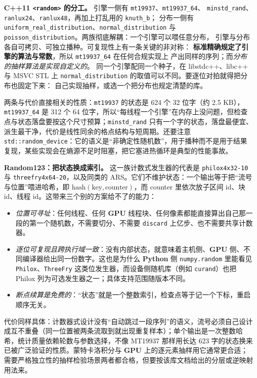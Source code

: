 \documentclass[12pt,a4paper,fontset=fandol]{ctexbook}
\newcommand{\Tp}[1]{\texttt{#1}}
\newcommand{\Bk}{\allowbreak}
\newcommand{\Lib}[1]{\textbf{#1}}
\newcommand{\Lang}[1]{\textsf{\bfseries #1}}
\newcommand{\CPP}{\Lang{C++}}
\newcommand{\PY}{\Lang{Python}}
\begin{document}
\textbf{\CPP{}11 \Tp{<random>} 的分工。} 引擎一侧有 \Tp{mt19937}、\Tp{mt19937\_64}、
\Tp{minstd\_{\Bk}rand}、\Tp{ranlux24}、\Tp{ranlux48}，再加上打乱用的 \Tp{knuth\_b}；
分布一侧有 \Tp{uniform\_{\Bk}real\_{\Bk}distribution}、\Tp{normal\_{\Bk}distribution} 与
\Tp{poisson\_{\Bk}distribution}。两族彻底解耦：一个引擎可以喂任意分布，
引擎与分布各自可拷贝、可独立播种。可复现性上有一条关键的非对称：
\textbf{标准精确规定了引擎的算法与常数}，所以 \Tp{mt19937\_64} 在任何合规实现上
产出同样的序列；而\emph{分布的抽样算法是实现自定义的}。
同一个引擎配同一个种子，在 libstdc++、libc++ 与 MSVC STL 上
\Tp{normal\_{\Bk}distribution} 的取值可以不同。要逐位对拍就得把分布也固定下来：
自己实现抽样，或选一个把分布也规定清楚的库。

两条与代价直接相关的性质：\Tp{mt19937} 的状态是 624 个 32 位字（约 2.5 KB），\Tp{mt19937\_64} 是 312 个 64 位字，所以``每线程一个引擎''在内存上没问题，但检查点与状态落盘要按这个尺寸预算；\Tp{minstd\_rand} 只有一个字的状态，落盘最便宜、派生最干净，代价是线性同余的格点结构与短周期。还要注意 \Tp{std::random\_device}：它的语义是``非确定性随机数''，用于播种而不是用于结果复现，某些实现会在熵源不足时阻塞，把它塞进热循环是典型的性能事故。

\textbf{\Lib{Random123}：把状态换成索引。} 这一族计数式发生器的代表是 \Tp{philox4x32-10} 与 \Tp{threefry4x64-20}，以及同类的 ARS。它们不维护状态：一个输出等于把``流号与位置''喂进哈希，即 $\mathrm{hash}(\text{key},\text{counter})$，而 counter 里依次放子区间 id、块 id、线程 id。这带来三个别的方案给不了的能力：
\begin{itemize}
\item \emph{位置可寻址}：任何线程、任何 \Lang{GPU} 线程块、任何像素都能直接算出自己那一段的第一个随机数，不需要切分、不需要 \Tp{discard} 上亿步、也不需要共享计数器。
\item \emph{逐位可复现且跨执行域一致}：没有内部状态，就意味着主机侧、\Lang{GPU} 侧、不同编译器给出同一份数字。这也是为什么 \PY{} 侧 \Tp{numpy.random} 里能看见 \Tp{Philox}、\Tp{ThreeFry} 这类位发生器，而设备侧随机库（例如 \Tp{curand}）也把 Philox 列为可选发生器之一；具体支持范围随版本不同。
\item \emph{断点续算是免费的}：``状态''就是一个整数索引，检查点等于记一个下标，重启顺序无关。
\end{itemize}
代价同样具体：计数器式设计没有``自动跳过一段序列''的语义，流号必须自己设计成互不重叠（同一位置被两条流取到就出现重复样本）；单个输出是一次整数哈希，统计质量依赖轮数与参数选择，不像 MT19937 那样用长达 623 字的状态换来已被广泛验证的性质。蒙特卡洛积分与 \Lang{GPU} 上的逐元素抽样用它通常更合适；需要严格独立性的抽样检验场景两者都合格，但要按该库文档给出的分层或逆映射用法来。
\end{document}
